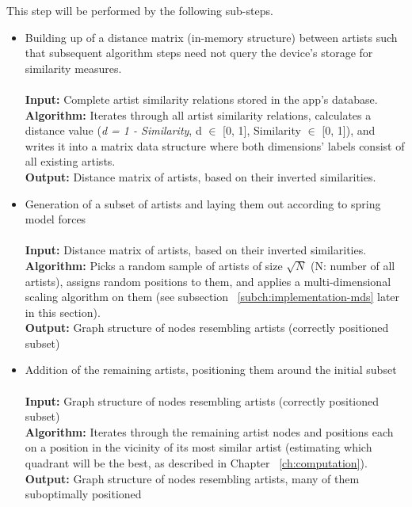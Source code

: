 \begin{itemize}
			This step will be performed by the following sub-steps.

		\begin{itemize}
			
			\item Building up of a distance matrix (in-memory structure) between artists such that subsequent algorithm steps need not query the device's storage for similarity measures. \\\\
				\textbf{Input:} Complete artist similarity relations stored in the app's database. \\
				\textbf{Algorithm:} Iterates through all artist similarity relations, calculates a
				distance value (\emph{d = 1 - Similarity}, d $\in$ [0, 1], Similarity $\in$ [0, 1]), and writes it into
				a matrix data structure where both dimensions' labels consist of all existing artists. \\
				\textbf{Output:} Distance matrix of artists, based on their inverted similarities. \\
				
			\item Generation of a subset of artists and laying them out according to spring model forces	\\\\
				\textbf{Input:} Distance matrix of artists, based on their inverted similarities. \\
				\textbf{Algorithm:} Picks a random sample of artists of size $\sqrt{N}$ (N: number of all artists), assigns random positions to them,
				and applies a multi-dimensional scaling algorithm on them (see subsection 
				~\ref{subch:implementation-mds} later in this section). \\
				\textbf{Output:} Graph structure of nodes resembling artists (correctly positioned subset) \\
				
			\item Addition of the remaining artists, positioning them around the initial subset \\\\
				\textbf{Input:} Graph structure of nodes resembling artists (correctly positioned subset) \\
				\textbf{Algorithm:} Iterates through the remaining artist nodes and positions each on a position
				in the vicinity of its most similar artist (estimating which quadrant will be the best, as described in Chapter ~\ref{ch:computation}). \\
				\textbf{Output:} Graph structure of nodes resembling artists, many of them suboptimally positioned \\
				

\end{itemize}
\end{itemize}
